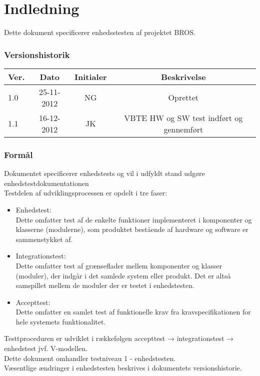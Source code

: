 \chapter{Indledning}
Dette dokument specificerer enhedsstesten af projektet BROS.
\subsection*{Versionshistorik}
\begin{table}[htbp]
\centering
\begin{tabular}{| l  | c | c | c |}
\hline
Ver. &Dato &Initialer &Beskrivelse\\\hline
1.0 &25-11-2012 &NG &Oprettet\\\hline
1.1 &16-12-2012 &JK	&VBTE HW og SW test indført og gennemført\\\hline
\end{tabular}
\end{table}
\subsection{Formål}
Dokumentet specificerer enhedstests og vil i udfyldt stand udgøre enhedstestdokumentationen\\
Testdelen af udviklingsprocessen er opdelt i tre faser:\\
\begin{itemize}
\item Enhedstest:\\
Dette omfatter test af de enkelte funktioner implementeret i komponenter og klasserne (modulerne), som produktet bestående af hardware og software er sammenstykket af.
\item Integrationstest:\\
Dette omfatter test af grænseflader mellem komponenter og klasser (moduler), der indgår i det samlede system eller produkt. Det er altså samspillet mellem de moduler der er testet i enhedstesten.
\item Accepttest:\\
Dette omfatter en samlet test af funktionelle krav fra kravspecifikationen for hele systemets funktionalitet.
\end{itemize}
Testtproceduren er udviklet i rækkefølgen accepttest → integrationstest → enhedstest jvf. V-modellen.\\
Dette dokument omhandler testniveau 1 - enhedstesten.\\
Væsentlige ændringer i enhedstesten beskrives i dokumentets versionshistorie.\\
